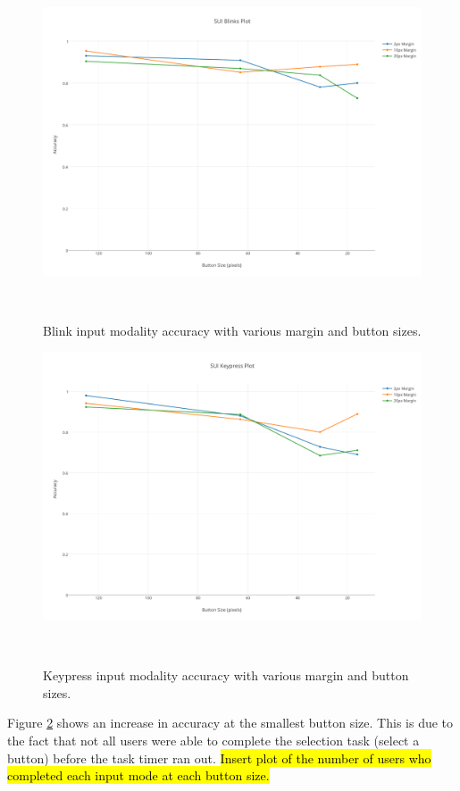 \documentclass{sigchi}
\begin{document}
\begin{figure}
\centering
  \includegraphics[width=0.9\columnwidth]{figures/blink-accuracy.pdf}
  \caption{Blink input modality accuracy with various margin and button sizes.
  }~\label{fig:blink-accuracy}
\end{figure}

\begin{figure}
\centering
  \includegraphics[width=0.9\columnwidth]{figures/keypress-accuracy.pdf}
  \caption{Keypress input modality accuracy with various margin and button sizes.
  }~\label{fig:keypress-accuracy}
\end{figure}

Figure \ref{fig:keypress-accuracy} shows an increase in accuracy at the smallest button size. This is due to the fact that not all users were able to complete the selection task (select a button) before the task timer ran out. \hl{Insert plot of the number of users who completed each input mode at each button size.}
\end{document}
